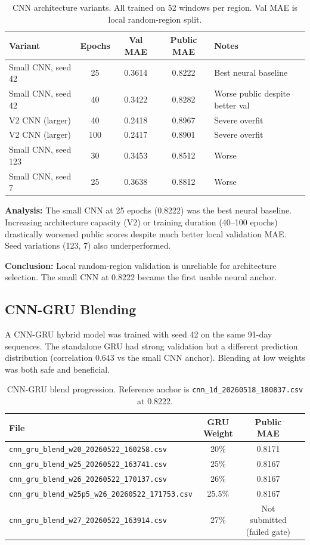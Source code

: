 \documentclass[12pt, a4paper]{article}
\begin{document}
\begin{table}[H]
\centering
\caption{CNN architecture variants. All trained on 52 windows per region. Val MAE is local random-region split.}
\label{tab:cnn}
\begin{tabular}{@{}lcccl@{}}
\toprule
\textbf{Variant} & \textbf{Epochs} & \textbf{Val MAE} & \textbf{Public MAE} & \textbf{Notes} \\
\midrule
Small CNN, seed 42      & 25 & 0.3614  & 0.8222 & Best neural baseline \\
Small CNN, seed 42      & 40 & 0.3422  & 0.8282 & Worse public despite better val \\
V2 CNN (larger)         & 40 & 0.2418  & 0.8967 & Severe overfit \\
V2 CNN (larger)         & 100& 0.2417  & 0.8901 & Severe overfit \\
Small CNN, seed 123     & 30 & 0.3453  & 0.8512 & Worse \\
Small CNN, seed 7       & 25 & 0.3638  & 0.8812 & Worse \\
\bottomrule
\end{tabular}
\end{table}

\textbf{Analysis:} The small CNN at 25 epochs (0.8222) was the best neural baseline. Increasing architecture capacity (V2) or training duration (40--100 epochs) drastically worsened public scores despite much better local validation MAE. Seed variations (123, 7) also underperformed.

\textbf{Conclusion:} Local random-region validation is unreliable for architecture selection. The small CNN at 0.8222 became the first usable neural anchor.

\subsection{CNN-GRU Blending}
A CNN-GRU hybrid model was trained with seed 42 on the same 91-day sequences. The standalone GRU had strong validation but a different prediction distribution (correlation 0.643 vs the small CNN anchor). Blending at low weights was both safe and beneficial.

\begin{table}[H]
\centering
\caption{CNN-GRU blend progression. Reference anchor is \texttt{cnn\_1d\_20260518\_180837.csv} at 0.8222.}
\label{tab:gru}
\begin{tabular}{@{}lccc@{}}
\toprule
\textbf{File} & \textbf{GRU Weight} & \textbf{Public MAE} \\
\midrule
\texttt{cnn\_gru\_blend\_w20\_20260522\_160258.csv}   & 20\%   & 0.8171 \\
\texttt{cnn\_gru\_blend\_w25\_20260522\_163741.csv}   & 25\%   & 0.8167 \\
\texttt{cnn\_gru\_blend\_w26\_20260522\_170137.csv}   & 26\%   & 0.8167 \\
\texttt{cnn\_gru\_blend\_w25p5\_w26\_20260522\_171753.csv} & 25.5\% & 0.8167 \\
\texttt{cnn\_gru\_blend\_w27\_20260522\_163914.csv}   & 27\%   & Not submitted (failed gate) \\
\bottomrule
\end{tabular}
\end{table}
\end{document}
